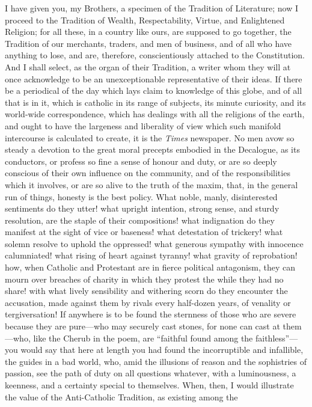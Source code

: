 I have given you, my Brothers, a specimen of the
Tradition of Literature; now I proceed to the Tradition
of Wealth, Respectability, Virtue, and Enlightened
Religion; for all these, in a country like ours, are
supposed to go together, the Tradition of our merchants,
traders, and men of business, and of all who have
anything to lose, and are, therefore, conscientiously
attached to the Constitution. And I shall select, as the
organ of their Tradition, a writer whom they will at once
acknowledge to be an unexceptionable representative of
their ideas. If there be a periodical of the day which
lays claim to knowledge of this globe, and of all that is
in it, which is catholic in its range of subjects, its
minute curiosity, and its world-wide correspondence,
which has dealings with all the religions of the earth,
and ought to have the largeness and liberality of view
which such manifold intercourse is calculated to create, it is the \emph{Times} newspaper. No men avow so steady
a devotion to the great moral precepts embodied in the
Decalogue, as its conductors, or profess so fine a sense
of honour and duty, or are so deeply conscious of their
own influence on the community, and of the
responsibilities which it involves, or are so alive to
the truth of the maxim, that, in the general run of
things, honesty is the best policy. What noble, manly,
disinterested sentiments do they utter! what upright
intention, strong sense, and sturdy resolution, are the
staple of their compositions! what indignation do they
manifest at the sight of vice or baseness! what
detestation of trickery! what solemn resolve to uphold
the oppressed! what generous sympathy with innocence
calumniated! what rising of heart against tyranny! what
gravity of reprobation! how, when Catholic and Protestant
are in fierce political antagonism, they can mourn over
breaches of charity in which they protest the while they
had no share! with what lively sensibility and withering
scorn do they encounter the accusation, made against them
by rivals every half-dozen years, of venality or
tergiversation! If anywhere is to be found the sternness
of those who are severe because they are pure—who
may securely cast stones, for none can cast at
them—who, like the Cherub in the poem, are
``faithful found among the faithless''—you
would say that here at length you had found the
incorruptible and infallible, the guides in a bad world,
who, amid the illusions of reason and the sophistries of
passion, see the path of duty on all questions whatever,
with a luminousness, a keenness, and a certainty special
to themselves. When, then, I would illustrate the value of the Anti-Catholic Tradition, as existing among the
